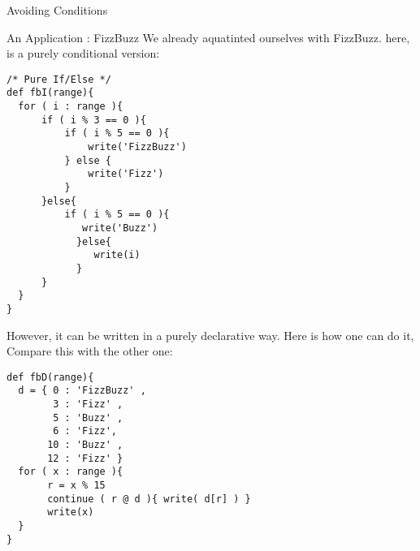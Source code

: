 \begin{section}{Avoiding Conditions}
\begin{subsection}{An Application : FizzBuzz}
We already aquatinted ourselves with FizzBuzz.
here, is a purely conditional version:
\begin{lstlisting}[style=JexlStyle]
/* Pure If/Else */
def fbI(range){
  for ( i : range ){
      if ( i % 3 == 0 ){
          if ( i % 5 == 0 ){ 
              write('FizzBuzz') 
          } else {
              write('Fizz') 
          }
      }else{
          if ( i % 5 == 0 ){
             write('Buzz') 
            }else{
               write(i) 
            }
      }
  }
}
\end{lstlisting} 
However, it can be written in a purely declarative way.
Here is how one can do it, Compare this with the other one:
\begin{lstlisting}[style=JexlStyle]
def fbD(range){
  d = { 0 : 'FizzBuzz' , 
        3 : 'Fizz' , 
        5 : 'Buzz' ,  
        6 : 'Fizz', 
       10 : 'Buzz' , 
       12 : 'Fizz' }
  for ( x : range ){
       r = x % 15  
       continue ( r @ d ){ write( d[r] ) }
       write(x)  
  }
}
\end{lstlisting}

\end{subsection}

\end{section}

